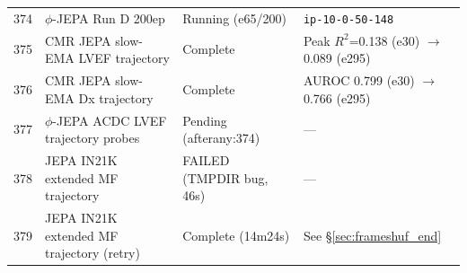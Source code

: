 \documentclass{article}
\begin{document}
\begin{center}
\begin{tabular}{llll}
374 & $\phi$-JEPA Run D 200ep & Running (e65/200) & \texttt{ip-10-0-50-148} \\
375 & CMR JEPA slow-EMA LVEF trajectory & Complete & Peak $R^2$=0.138 (e30) $\to$ 0.089 (e295) \\
376 & CMR JEPA slow-EMA Dx trajectory & Complete & AUROC 0.799 (e30) $\to$ 0.766 (e295) \\
377 & $\phi$-JEPA ACDC LVEF trajectory probes & Pending (afterany:374) & --- \\
378 & JEPA IN21K extended MF trajectory & FAILED (TMPDIR bug, 46s) & --- \\
379 & JEPA IN21K extended MF trajectory (retry) & Complete (14m24s) & See §\ref{sec:frameshuf_end} \\
\bottomrule
\end{tabular}
\end{center}
\end{document}
